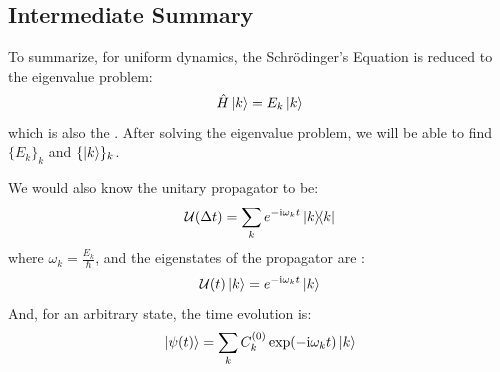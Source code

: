 \subsection{Intermediate Summary}
To summarize, for uniform dynamics, the Schr\"odinger's Equation is reduced to the eigenvalue problem:
$$\hat{H}\ket{k} = E_k \ket{k}$$
which is also the . After solving the eigenvalue problem, we will be able to find $\{E_k\}_k$ and $\{\ket{k}\}_k$. \par
We would also know the unitary propagator to be:
$$\opuni(\Delta t) = \Sumi{k} e^{-\imag \omega_k t}\dyad{k}$$
where $\omega_k = \frac{E_k}{\hbar}$, and the eigenstates of the propagator are :
$$\mathcal{U}(t)\ket{k} = e^{-\mathrm{i} \omega_k t}\ket{k}$$
And, for an arbitrary state, the time evolution is:
$$\ket{\psi(t)} = \sum_{k} C_k^{(0)}\exp(-\mathrm{i} \omega_k t) \ket{k}$$

